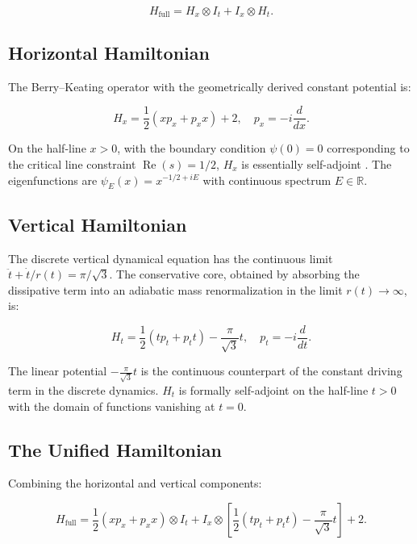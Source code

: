 \documentclass[12pt,a4paper]{article}
\begin{document}
\begin{equation}
H_{\text{full}} = H_x \otimes I_t + I_x \otimes H_t.
\end{equation}

\subsection{Horizontal Hamiltonian}

The Berry--Keating operator with the geometrically derived constant potential is:

\begin{equation}
\boxed{H_x = \frac{1}{2}(x p_x + p_x x) + 2}, \quad p_x = -i\frac{d}{dx}.
\end{equation}

On the half-line $x > 0$, with the boundary condition $\psi(0) = 0$ corresponding to the critical line constraint $\operatorname{Re}(s) = 1/2$, $H_x$ is essentially self-adjoint \cite{berry-keating}. The eigenfunctions are $\psi_E(x) = x^{-1/2 + iE}$ with continuous spectrum $E \in \mathbb{R}$.

\subsection{Vertical Hamiltonian}

The discrete vertical dynamical equation has the continuous limit $\ddot{t} + \dot{t}/r(t) = \pi/\sqrt{3}$. The conservative core, obtained by absorbing the dissipative term into an adiabatic mass renormalization in the limit $r(t) \to \infty$, is:

\begin{equation}
\boxed{H_t = \frac{1}{2}(t p_t + p_t t) - \frac{\pi}{\sqrt{3}}t}, \quad p_t = -i\frac{d}{dt}.
\end{equation}

The linear potential $-\frac{\pi}{\sqrt{3}}t$ is the continuous counterpart of the constant driving term in the discrete dynamics. $H_t$ is formally self-adjoint on the half-line $t > 0$ with the domain of functions vanishing at $t = 0$.

\subsection{The Unified Hamiltonian}

Combining the horizontal and vertical components:

\begin{equation}
\boxed{H_{\text{full}} = \frac{1}{2}(x p_x + p_x x) \otimes I_t + I_x \otimes \left[\frac{1}{2}(t p_t + p_t t) - \frac{\pi}{\sqrt{3}}t\right] + 2}.
\end{equation}
\end{document}
